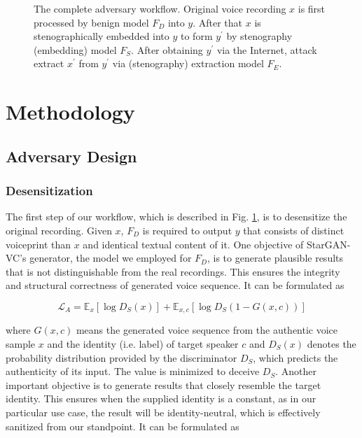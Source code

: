 \documentclass[journal]{IEEEtran} %
\begin{document}
\begin{figure}[!t]
    \caption{The complete adversary workflow. Original voice recording $x$ is first processed by benign model $F_D$ into $y$. After that $x$ is stenographically embedded into $y$ to form $y^{\prime}$ by stenography (embedding) model $F_S$. After obtaining $y^{\prime}$ via the Internet, attack extract $x^{\prime}$ from $y^{\prime}$ via (stenography) extraction model $F_E$.}
    \label{fig:method}
\end{figure}

\section{Methodology}
\label{seg:method}

\subsection{Adversary Design}

\subsubsection{Desensitization}

The first step of our workflow, which is described in Fig. \ref{fig:method}, is to desensitize the original recording. Given $x$, $F_D$ is required to output $y$ that consists of distinct voiceprint than $x$ and identical textual content of it. One objective of StarGAN-VC\cite{a3}'s generator, the model we employed for $F_D$, is to generate plausible results that is not distinguishable from the real recordings. This ensures the integrity and structural correctness of generated voice sequence. It can be formulated as

\begin{equation}
    \label{eqn:adv_loss}
    \mathcal{L}_A = \mathbb{E}_{x}[\log D_S(x)] + \mathbb{E}_{x, c}[\log D_S(1 - G(x, c))]
\end{equation}

where $G(x, c)$ means the generated voice sequence from the authentic voice sample $x$ and the identity (i.e. label) of target speaker $c$ and $D_S(x)$ denotes the probability distribution provided by the discriminator $D_S$, which predicts the authenticity of its input. The value is minimized to deceive $D_S$. Another important objective is to generate results that closely resemble the target identity. This ensures when the supplied identity is a constant, as in our particular use case, the result will be identity-neutral, which is effectively sanitized from our standpoint. It can be formulated as
\end{document}
